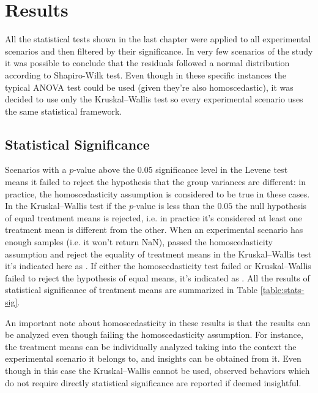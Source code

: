 \chapter{Results}
\label{cap:results}

All the statistical tests shown in the last chapter were applied to all experimental scenarios and then filtered by their significance. In very few scenarios of the study it was possible to conclude that the residuals followed a normal distribution according to Shapiro-Wilk test. Even though in these specific instances the typical ANOVA test could be used (given they're also homoscedastic), it was decided to use only the Kruskal–Wallis test so every experimental scenario uses the same statistical framework.

\section{Statistical Significance}

Scenarios with a $p$-value above the 0.05 significance level in the Levene test means it failed to reject the hypothesis that the group variances are different: in practice, the homoscedasticity assumption is considered to be true in these cases. In the Kruskal–Wallis test if the $p$-value is less than the $0.05$ the null hypothesis of equal treatment means is rejected, i.e. in practice it's considered at least one treatment mean is different from the other. When an experimental scenario has enough samples (i.e. it won't return NaN), passed the homoscedasticity assumption and reject the equality of treatment means in the Kruskal–Wallis test it's indicated here as \ok. If either the homoscedasticity test failed or Kruskal–Wallis failed to reject the hypothesis of equal means, it's indicated as \notok. All the results of statistical significance of treatment means are summarized in Table \ref{table:stats-sig}.

An important note about homoscedasticity in these results is that the results can be analyzed even though failing the homoscedasticity assumption. For instance, the treatment means can be individually analyzed taking into the context the experimental scenario it belongs to, and insights can be obtained from it. Even though in this case the Kruskal–Wallis cannot be used, observed behaviors which do not require directly statistical significance are reported if deemed insightful.

